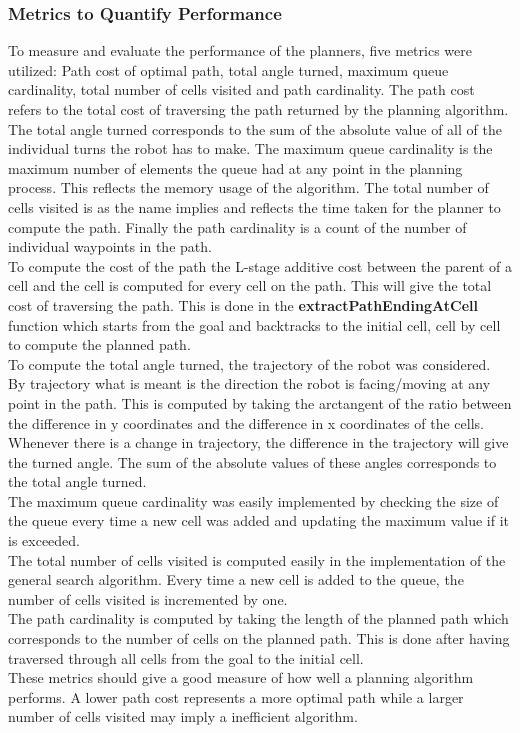 \documentclass[a4paper,12pt]{article}
\begin{document}
			\subsubsection{Metrics to Quantify Performance}
				To measure and evaluate the performance of the planners, five metrics were utilized: Path cost of optimal path, total angle turned, maximum queue cardinality, total number of cells visited and path cardinality. The path cost refers to the total cost of traversing the path returned by the planning algorithm. The total angle turned corresponds to the sum of the absolute value of all of the individual turns the robot has to make. The maximum queue cardinality is the maximum number of elements the queue had at any point in the planning process. This reflects the memory usage of the algorithm. The total number of cells visited is as the name implies and reflects the time taken for the planner to compute the path. Finally the path cardinality is a count of the number of individual waypoints in the path.
				\\
				To compute the cost of the path the L-stage additive cost between the parent of a cell and the cell is computed for every cell on the path. This will give the total cost of traversing the path. This is done in the \textbf{extractPathEndingAtCell} function which starts from the goal and backtracks to the initial cell, cell by cell to compute the planned path.
				\\
				To compute the total angle turned, the trajectory of the robot was considered. By trajectory what is meant is the direction the robot is facing/moving at any point in the path. This is computed by taking the arctangent of the ratio between the difference in y coordinates and the difference in x coordinates of the cells. Whenever there is a change in trajectory, the difference in the trajectory will give the turned angle. The sum of the absolute values of these angles corresponds to the total angle turned. 
				\\
				The maximum queue cardinality was easily implemented by checking the size of the queue every time a new cell was added and updating the maximum value if it is exceeded.
				\\
				The total number of cells visited is computed easily in the implementation of the general search algorithm. Every time a new cell is added to the queue, the number of cells visited is incremented by one. 
				\\
				The path cardinality is computed by taking the length of the planned path which corresponds to the number of cells on the planned path. This is done after having traversed through all cells from the goal to the initial cell. 
				\\
				These metrics should give a good measure of how well a planning algorithm performs. A lower path cost represents a more optimal path while a larger number of cells visited may imply a inefficient algorithm. 
\end{document}
